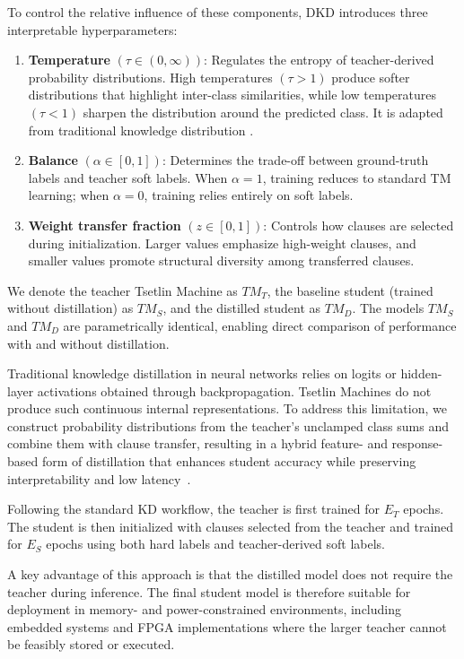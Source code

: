 \documentclass[sn-mathphys-num]{sn-jnl}%
\theoremstyle{thmstyleone}%
\theoremstyle{thmstyletwo}%
\theoremstyle{thmstylethree}%
\begin{document}
To control the relative influence of these components, DKD introduces three interpretable hyperparameters:
\begin{enumerate}
    \item \textbf{Temperature} $(\tau \in (0,\infty))$: Regulates the entropy of teacher-derived probability distributions. High temperatures $(\tau > 1)$ produce softer distributions that highlight inter-class similarities, while low temperatures $(\tau < 1)$ sharpen the distribution around the predicted class. It is adapted from traditional knowledge distribution \cite{hinton2015distillingknowledgeneuralnetwork}.
    \item \textbf{Balance} $(\alpha \in [0,1])$: Determines the trade-off between ground-truth labels and teacher soft labels. When $\alpha = 1$, training reduces to standard TM learning; when $\alpha = 0$, training relies entirely on soft labels.
    \item \textbf{Weight transfer fraction} $(z \in [0,1])$: Controls how clauses are selected during initialization. Larger values emphasize high-weight clauses, and smaller values promote structural diversity among transferred clauses.
\end{enumerate}

We denote the teacher Tsetlin Machine as $TM_T$, the baseline student (trained without distillation) as $TM_S$, and the distilled student as $TM_D$. The models $TM_S$ and $TM_D$ are parametrically identical, enabling direct comparison of performance with and without distillation.

Traditional knowledge distillation in neural networks relies on logits or hidden-layer activations obtained through backpropagation. Tsetlin Machines do not produce such continuous internal representations. To address this limitation, we construct probability distributions from the teacher's unclamped class sums and combine them with clause transfer, resulting in a hybrid feature- and response-based form of distillation that enhances student accuracy while preserving interpretability and low latency~\cite{anjum2024novel, xu2023initializingmodelslargerones}. 

Following the standard KD workflow, the teacher is first trained for $E_T$ epochs. The student is then initialized with clauses selected from the teacher and trained for $E_S$ epochs using both hard labels and teacher-derived soft labels.

A key advantage of this approach is that the distilled model does not require the teacher during inference. The final student model is therefore suitable for deployment in memory- and power-constrained environments, including embedded systems and FPGA implementations where the larger teacher cannot be feasibly stored or executed.
\end{document}
